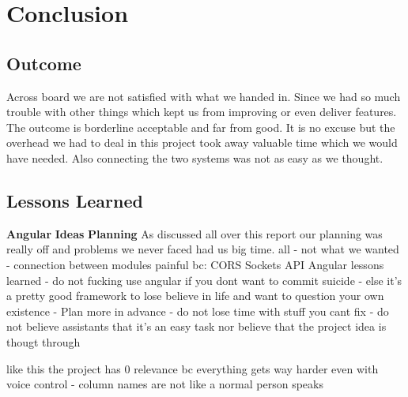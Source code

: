 \section{Conclusion}
\label{g1:sec:conclusion}
\subsection{Outcome}
Across board we are not satisfied with what we handed in. Since we had so much trouble with other things which kept us from improving or even deliver features. The outcome is borderline acceptable and far from good. It is no excuse but the overhead we had to deal in this project took away valuable time which we would have needed. Also connecting the two systems was not as easy as we thought.
\subsection{Lessons Learned}
\textbf{Angular}
\textbf{Ideas}
\textbf{Planning}
As discussed all over this report our planning was really off and problems we never faced had us big time. 
all - not what we wanted - connection between modules painful bc:
    CORS
    Sockets
    API
    Angular
lessons learned
- do not fucking use angular if you dont want to commit suicide - else it's a pretty good framework to lose believe in life and want to question your own existence
- Plan more in advance 
- do not lose time with stuff you cant fix
- do not believe assistants that it's an easy task nor believe that the project idea is thougt through 

like this the project has 0 relevance bc everything gets way harder even with voice control - column names are not like a normal person speaks
